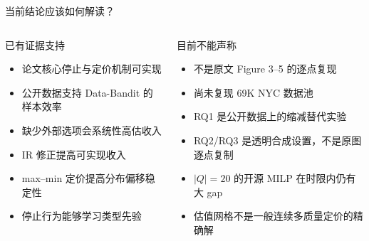 \documentclass[aspectratio=169,10pt]{ctexbeamer}
\begin{document}
\begin{frame}{当前结论应该如何解读？}
\begin{columns}[T,onlytextwidth]
\begin{exampleblock}{已有证据支持}
\begin{itemize}
  \item 论文核心停止与定价机制可实现
  \item 公开数据支持 Data-Bandit 的样本效率
  \item 缺少外部选项会系统性高估收入
  \item IR 修正提高可实现收入
  \item max--min 定价提高分布偏移稳定性
  \item 停止行为能够学习类型先验
\end{itemize}
\end{exampleblock}
\begin{alertblock}{目前不能声称}
\begin{itemize}
  \item 不是原文 Figure 3--5 的逐点复现
  \item 尚未复现 69K NYC 数据池
  \item RQ1 是公开数据上的缩减替代实验
  \item RQ2/RQ3 是透明合成设置，不是原图逐点复制
  \item $|Q|=20$ 的开源 MILP 在时限内仍有大 gap
  \item 估值网格不是一般连续多质量定价的精确解
\end{itemize}
\end{alertblock}
\end{columns}
\end{frame}
\end{document}
